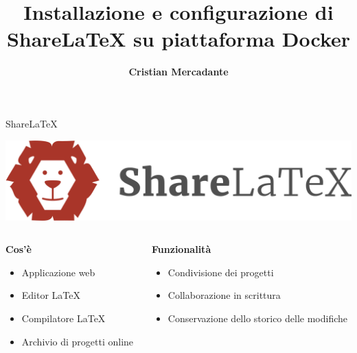 \documentclass[aspectratio=169]{beamer}
\author{\textbf{Cristian Mercadante}}
\title[Installazione e configurazione di ShareLaTeX]{Installazione e configurazione di\\ShareLaTeX su piattaforma Docker}
\institute{\small
\textbf{Relatore:}\\
Prof. Costantino Grana\\
\textbf{Correlatore:}\\
Dott. Federico Bolelli
}
\date{}
\begin{document}
\begin{frame}
    \titlepage
\end{frame}

\begin{frame}{ShareLaTeX}
    \begin{center}
        \includegraphics[scale=0.25]{img/sharelatex_logo.png}
    \end{center}
    \begin{columns}[T]
        \begin{column}{0.5\textwidth}
            \textbf{Cos'è}
            \begin{itemize}
                \item Applicazione web
                \item Editor \LaTeX
                \item Compilatore \LaTeX
                \item Archivio di progetti online
            \end{itemize}
        \end{column}
        \begin{column}{0.5\textwidth}
            \textbf{Funzionalità}
            \begin{itemize}
                \item Condivisione dei progetti
                \item Collaborazione in scrittura
                \item Conservazione dello storico delle modifiche
            \end{itemize}
        \end{column}
    \end{columns}
\end{frame}
\end{document}
